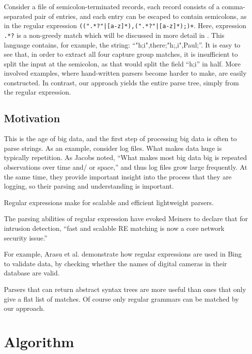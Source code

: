 \documentclass[english]{sigplanconf}
\theoremstyle{definition}
\begin{document}
Consider a file of semicolon-terminated records, each record consists
of a comma-separated pair of entries, and each entry can be escaped
to contain semicolons, as in the regular expression
\texttt{((".*?"|[a-z]*),(".*?"|[a-z]*);)+}. Here, expression
\texttt{.*?} is a non-greedy match which will be discussed in more
detail in .  This language contains, for example, the
string: ``"h;i",there;"h;,i",Paul;''.  It is easy to see that, in
order to extract all four capture group matches, it is insufficient
to split the input at the semicolon, as that would split the field
``h;i'' in half.  More involved examples, where hand-written parsers
become harder to make, are easily constructed.  In contrast, our
approach yields the entire parse tree, simply from the regular
expression.



\subsection{Motivation}

This is the age of big data, and the first step of processing big
data is often to parse strings. As an example, consider log files.
What makes data huge is typically repetition. As Jacobs\cite{Jaco09a}
noted, ``What makes most big data big is repeated observations over
time and/ or space,'' and thus log files grow large frequently. At
the same time, they provide important insight into the process that
they are logging, so their parsing and understanding is important. 

Regular expressions make for scalable and efficient lightweight parsers.\cite{Kart96a} 

The parsing abilities of regular expression have evoked Meiners to declare
that for intrusion detection, ``fast and scalable RE matching is
now a core network security issue.'' \cite{Mein10a}

For example, Arasu et al. \cite{Aras12a} demonstrate how regular
expressions are used in Bing to validate data, by checking whether
the names of digital cameras in their database are valid.

Parsers that can return abstract syntax trees are more useful than
ones that only give a flat list of matches. Of course only regular
grammars can be matched by our approach.

\section{Algorithm}
\end{document}
